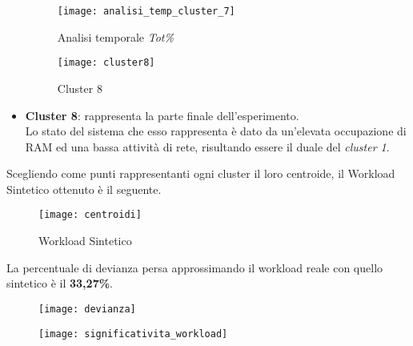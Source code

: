 \begin{itemize}
  \begin{figure}[!htbp]
    \centering
    \texttt{[image: analisi\_temp\_cluster\_7]}
    \caption{Analisi temporale \textit{Tot\%}}
    \label{webserver_analisi_temp_cluster_7}
  \end{figure}

  \clearpage

  \begin{figure}[!htbp]
    \centering
    \texttt{[image: cluster8]}
    \caption{Cluster 8}
    \label{webserver_cluster8}
  \end{figure}

  \item \textbf{Cluster 8}: rappresenta la parte finale dell'esperimento.\\
  Lo stato del sistema che esso rappresenta è dato da un'elevata occupazione
  di RAM ed una bassa attività di rete, risultando essere il duale del \textit{cluster 1}.\\

\end{itemize}
\clearpage
Scegliendo come punti rappresentanti ogni cluster il loro centroide, il Workload
Sintetico ottenuto è il seguente.
\begin{figure}[!htbp]
  \centering
  \texttt{[image: centroidi]}
  \caption{Workload Sintetico}
  \label{webserver_centroidi}
\end{figure}

La percentuale di devianza persa approssimando il workload reale con quello
sintetico è il \textbf{33,27\%}.

\begin{minipage}{\linewidth}
  \centering
  \begin{minipage}{0.48\linewidth}
    \begin{figure}[H]
      \texttt{[image: devianza]}
    \end{figure}
  \end{minipage}
  \begin{minipage}{0.48\linewidth}
    \begin{figure}[H]
      \texttt{[image: significativita\_workload]}
    \end{figure}
  \end{minipage}
\end{minipage}

\clearpage

